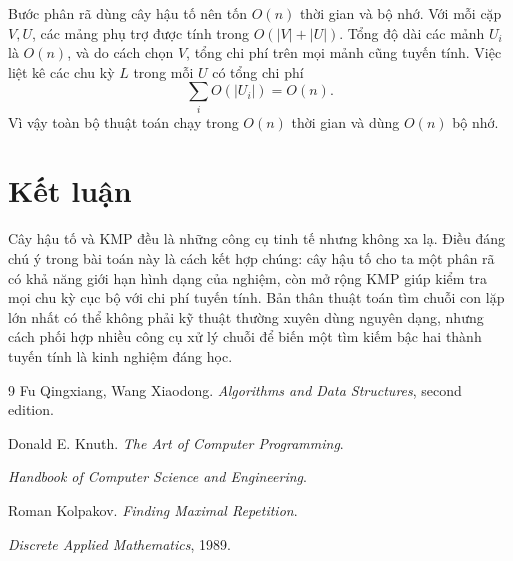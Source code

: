 \documentclass[11pt]{article}
\begin{document}
Bước phân rã dùng cây hậu tố nên tốn \(O(n)\) thời gian và bộ nhớ. Với mỗi
cặp \(V,U\), các mảng phụ trợ được tính trong \(O(|V|+|U|)\). Tổng độ dài các
mảnh \(U_i\) là \(O(n)\), và do cách chọn \(V\), tổng chi phí trên mọi mảnh
cũng tuyến tính. Việc liệt kê các chu kỳ \(L\) trong mỗi \(U\) có tổng chi phí
\[
  \sum_i O(|U_i|)=O(n).
\]
Vì vậy toàn bộ thuật toán chạy trong \(O(n)\) thời gian và dùng \(O(n)\) bộ
nhớ.

\section{Kết luận}

Cây hậu tố và KMP đều là những công cụ tinh tế nhưng không xa lạ. Điều đáng
chú ý trong bài toán này là cách kết hợp chúng: cây hậu tố cho ta một phân rã
có khả năng giới hạn hình dạng của nghiệm, còn mở rộng KMP giúp kiểm tra mọi
chu kỳ cục bộ với chi phí tuyến tính. Bản thân thuật toán tìm chuỗi con lặp
lớn nhất có thể không phải kỹ thuật thường xuyên dùng nguyên dạng, nhưng cách
phối hợp nhiều công cụ xử lý chuỗi để biến một tìm kiếm bậc hai thành tuyến
tính là kinh nghiệm đáng học.

\begin{thebibliography}{9}
Fu Qingxiang, Wang Xiaodong.
\textit{Algorithms and Data Structures}, second edition.

Donald E. Knuth.
\textit{The Art of Computer Programming}.

\textit{Handbook of Computer Science and Engineering}.

Roman Kolpakov.
\textit{Finding Maximal Repetition}.

\textit{Discrete Applied Mathematics}, 1989.
\end{thebibliography}
\end{document}
